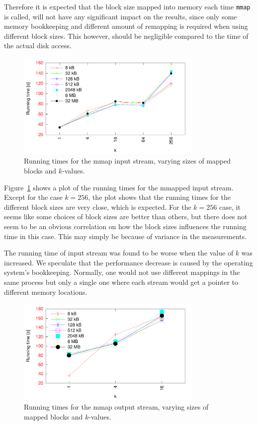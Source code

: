 \documentclass[a4paper,12pt]{article}
\begin{document}
Therefore it is expected that the block size mapped into memory each
time \texttt{mmap} is called, will not have any significant impact on
the results, since only some memory bookkeeping and different amount
of remapping is required when using different block sizes. This
however, should be negligible compared to the time of the actual disk
access.

\begin{figure}[h!]
  \centering
  \includegraphics[width=0.8\textwidth]{mmap_input}
  \caption{Running times for the mmap input stream, varying sizes of
    mapped blocks and $k$-values.}
  \label{fig:mmap-input}
\end{figure}

Figure~\ref{fig:mmap-input} shows a plot of the running times for the
mmapped input stream. Except for the case $k = 256$, the plot shows
that the running times for the different block sizes are very close,
which is expected. For the $k = 256$ case, it seems like some choices
of block sizes are better than others, but there does not seem to be an
obvious correlation on how the block sizes influences the running time
in this case. This may simply be because of variance in the
measurements.

The running time of input stream was found to be worse when the value
of $k$ was increased. We speculate that the performance decrease is caused by the operating system's bookkeeping. Normally, one would not use different mappings in the same process but only a single one where each stream would get a pointer to different memory locations.

\begin{figure}[h!]
  \centering
  \includegraphics[width=0.8\textwidth]{mmap_output}
  \caption{Running times for the mmap output stream, varying sizes of
    mapped blocks and $k$-values.}
  \label{fig:mmap-output}
\end{figure}
\end{document}
